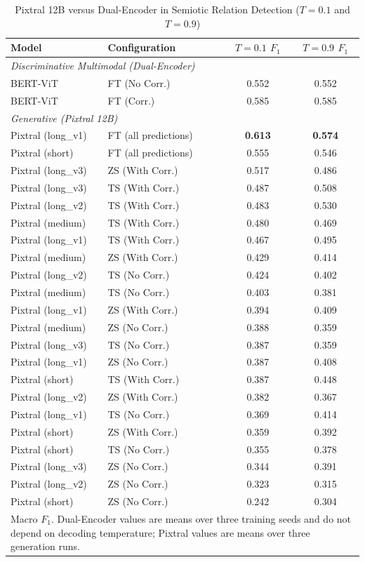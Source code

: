 \begin{table}[!t]
\centering
\caption{Pixtral 12B versus Dual-Encoder in Semiotic Relation Detection ($T=0.1$ and $T=0.9$)}
\label{tab:relation_pixtral}
\footnotesize
\renewcommand{\arraystretch}{0.90}
\begin{tabular}{l l c c}
\hline
\textbf{Model} & \textbf{Configuration} & \textbf{$T = 0.1$ $F_1$} & \textbf{$T = 0.9$ $F_1$} \\
\hline
\multicolumn{4}{l}{\textit{Discriminative Multimodal (Dual-Encoder)}} \\
BERT-ViT & FT (No Corr.) & 0.552 & 0.552 \\
BERT-ViT & FT (Corr.) & 0.585 & 0.585 \\
\hline
\multicolumn{4}{l}{\textit{Generative (Pixtral 12B)}} \\
Pixtral (long\_v1) & FT (all predictions) & \textbf{0.613} & \textbf{0.574} \\
Pixtral (short) & FT (all predictions) & 0.555 & 0.546 \\
Pixtral (long\_v3) & ZS (With Corr.) & 0.517 & 0.486 \\
Pixtral (long\_v3) & TS (With Corr.) & 0.487 & 0.508 \\
Pixtral (long\_v2) & TS (With Corr.) & 0.483 & 0.530 \\
Pixtral (medium) & TS (With Corr.) & 0.480 & 0.469 \\
Pixtral (long\_v1) & TS (With Corr.) & 0.467 & 0.495 \\
Pixtral (medium) & ZS (With Corr.) & 0.429 & 0.414 \\
Pixtral (long\_v2) & TS (No Corr.) & 0.424 & 0.402 \\
Pixtral (medium) & TS (No Corr.) & 0.403 & 0.381 \\
Pixtral (long\_v1) & ZS (With Corr.) & 0.394 & 0.409 \\
Pixtral (medium) & ZS (No Corr.) & 0.388 & 0.359 \\
Pixtral (long\_v3) & TS (No Corr.) & 0.387 & 0.359 \\
Pixtral (long\_v1) & ZS (No Corr.) & 0.387 & 0.408 \\
Pixtral (short) & TS (With Corr.) & 0.387 & 0.448 \\
Pixtral (long\_v2) & ZS (With Corr.) & 0.382 & 0.367 \\
Pixtral (long\_v1) & TS (No Corr.) & 0.369 & 0.414 \\
Pixtral (short) & ZS (With Corr.) & 0.359 & 0.392 \\
Pixtral (short) & TS (No Corr.) & 0.355 & 0.378 \\
Pixtral (long\_v3) & ZS (No Corr.) & 0.344 & 0.391 \\
Pixtral (long\_v2) & ZS (No Corr.) & 0.323 & 0.315 \\
Pixtral (short) & ZS (No Corr.) & 0.242 & 0.304 \\
\hline
\multicolumn{4}{p{0.95\columnwidth}}{\footnotesize Macro $F_1$. Dual-Encoder values are means over three training seeds and do not depend on decoding temperature; Pixtral values are means over three generation runs.} \\
\end{tabular}
\end{table}

